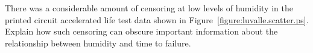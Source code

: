 \begin{exercise}
There was a considerable amount of censoring at low levels of
humidity in the printed circuit accelerated life test data shown in
Figure~\ref{figure:luvalle.scatter.ps}. Explain how such censoring 
can obscure important information about the relationship between
humidity and time to failure.
\end{exercise}

